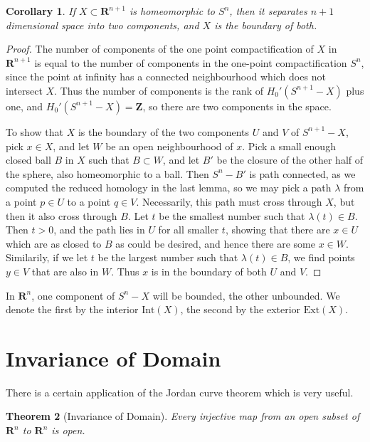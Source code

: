 \documentclass{article}
\theoremstyle{plain}
\newtheorem{theorem}{Theorem}
\newtheorem{corollary}[theorem]{Corollary}
\begin{document}
\begin{corollary}
    If $X \subset \mathbf{R}^{n+1}$ is homeomorphic to $S^n$, then it separates $n+1$ dimensional space into two components, and $X$ is the boundary of both.
\end{corollary}
\begin{proof}
    The number of components of the one point compactification of $X$ in $\mathbf{R}^{n+1}$ is equal to the number of components in the one-point compactification $S^n$, since the point at infinity has a connected neighbourhood which does not intersect $X$. Thus the number of components is the rank of $H_0'(S^{n+1} - X)$ plus one, and $H_0'(S^{n+1} - X) = \mathbf{Z}$, so there are two components in the space.

    To show that $X$ is the boundary of the two components $U$ and $V$ of $S^{n+1} - X$, pick $x \in X$, and let $W$ be an open neighbourhood of $x$. Pick a small enough closed ball $B$ in $X$ such that $B \subset W$, and let $B'$ be the closure of the other half of the sphere, also homeomorphic to a ball. Then $S^n - B'$ is path connected, as we computed the reduced homology in the last lemma, so we may pick a path $\lambda$ from a point $p \in U$ to a point $q \in V$. Necessarily, this path must cross through $X$, but then it also cross through $B$. Let $t$ be the smallest number such that $\lambda(t) \in B$. Then $t > 0$, and the path lies in $U$ for all smaller $t$, showing that there are $x \in U$ which are as closed to $B$ as could be desired, and hence there are some $x \in W$. Similarily, if we let $t$ be the largest number such that $\lambda(t) \in B$, we find points $y \in V$ that are also in $W$. Thus $x$ is in the boundary of both $U$ and $V$.
\end{proof}

In $\mathbf{R}^n$, one component of $S^n - X$ will be bounded, the other unbounded. We denote the first by the interior $\text{Int}(X)$, the second by the exterior $\text{Ext}(X)$.

\section{Invariance of Domain}

There is a certain application of the Jordan curve theorem which is very useful.

\begin{theorem}[Invariance of Domain]
    Every injective map from an open subset of $\mathbf{R}^n$ to $\mathbf{R}^n$ is open.
\end{theorem}
\end{document}
